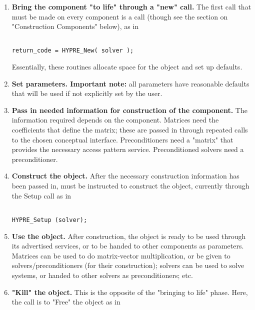 \begin{enumerate}
\begin{enumerate}
\item
{\bf Bring the component "to life" through a "new" call.} The first call that must
be made on every 
\hypre{} component is a  call (though see the section on "Construction
Components" below), as 
in 

\begin{display}
\begin{verbatim}

return_code = HYPRE_New( solver );

\end{verbatim}
\end{display}

Essentially, these routines allocate
space for the object and 
set up defaults.

\item
{\bf Set parameters.  Important note:} all parameters have reasonable defaults
that will be used if not 
explicitly set by the user.

\item
{\bf Pass in needed information for construction of the component.} The
information required depends 
on the component. Matrices need the coefficients that define the matrix; these
are passed in through 
repeated calls to the chosen conceptual interface. Preconditioners need a
"matrix" that provides the 
necessary access pattern service. Preconditioned solvers need a preconditioner.

\item
{\bf Construct the object.} After the necessary construction information has been
passed in, \hypre{} must 
be instructed to construct the object, currently through the Setup call as in

\begin{display}
\begin{verbatim}

HYPRE_Setup (solver);

\end{verbatim}
\end{display}

\item
{\bf Use the object.} After construction, the object is ready to be used through
its advertised services, or to 
be handed to other components as parameters. Matrices can be used to do
matrix-vector multiplication, 
or be given to solvers/preconditioners (for their construction); solvers can be
used to solve systems, or 
handed to other solvers as preconditioners; etc.

\item
{\bf "Kill" the object.} This is the opposite of the "bringing to life" phase.
Here, the call is to "Free" the 
object as in 


\end{enumerate}
\end{enumerate}
